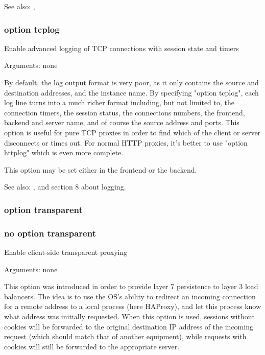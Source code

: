   See also: , 

\subsubsection[option tcplog]{option tcplog}


  Enable advanced logging of TCP connections with session state and timers


  Arguments: none

  By default, the log output format is very poor, as it only contains the
  source and destination addresses, and the instance name. By specifying
  "option tcplog", each log line turns into a much richer format including, but
  not limited to, the connection timers, the session status, the connections
  numbers, the frontend, backend and server name, and of course the source
  address and ports. This option is useful for pure TCP proxies in order to
  find which of the client or server disconnects or times out. For normal HTTP
  proxies, it's better to use "option httplog" which is even more complete.

  This option may be set either in the frontend or the backend.

  See also: , and section 8 about logging.

\subsubsection[option transparent]{option transparent}
\subsubsection[no option transparent]{no option transparent}


  Enable client-side transparent proxying


  Arguments: none

  This option was introduced in order to provide layer 7 persistence to layer 3
  load balancers. The idea is to use the OS's ability to redirect an incoming
  connection for a remote address to a local process (here HAProxy), and let
  this process know what address was initially requested. When this option is
  used, sessions without cookies will be forwarded to the original destination
  IP address of the incoming request (which should match that of another
  equipment), while requests with cookies will still be forwarded to the
  appropriate server.

